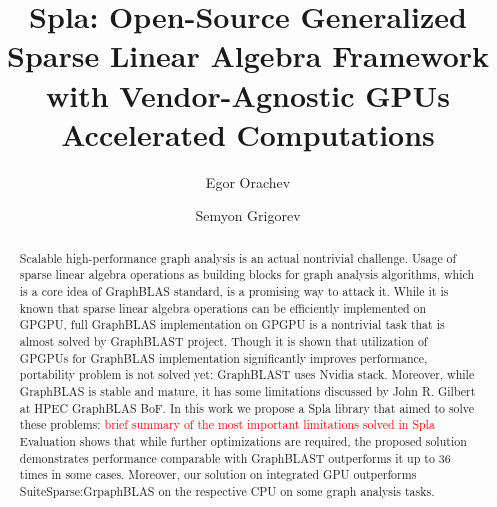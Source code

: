 \documentclass[sigconf, anonymous, review,table]{acmart}
\begin{document}
\title[Generalized Sparse Linear Algebra Framework with Vendor-Agnostic GPUs Accelerated Computations]{Spla: Open-Source Generalized Sparse Linear Algebra Framework with Vendor-Agnostic GPUs Accelerated Computations}

\author{Egor Orachev}
\author{Semyon Grigorev}



\renewcommand{\shortauthors}{Orachev, Grigorev}


\begin{abstract}
    Scalable high-performance graph analysis is an actual nontrivial challenge. Usage of sparse linear algebra operations as building blocks for graph analysis algorithms, which is a core idea of GraphBLAS standard, is a promising way to attack it.
    While it is known that sparse linear algebra operations can be efficiently implemented on GPGPU, full GraphBLAS implementation on GPGPU is a nontrivial task that is almost solved by GraphBLAST project. Though it is shown that utilization of GPGPUs for GraphBLAS implementation significantly improves performance, portability problem is not solved yet: GraphBLAST uses Nvidia stack. 
    Moreover, while GraphBLAS is stable and mature, it has some limitations discussed by John R. Gilbert at HPEC GraphBLAS BoF. 
    In this work we propose a Spla library that aimed to solve these problems: \textcolor{red}{brief summary of the most important limitations solved in Spla}
    Evaluation shows that while further optimizations are required, the proposed solution demonstrates performance comparable with GraphBLAST outperforms it up to 36 times in some cases. Moreover, our solution on integrated GPU outperforms SuiteSparse:GrpaphBLAS on the respective CPU on some graph analysis tasks.
\end{abstract}
\end{document}
